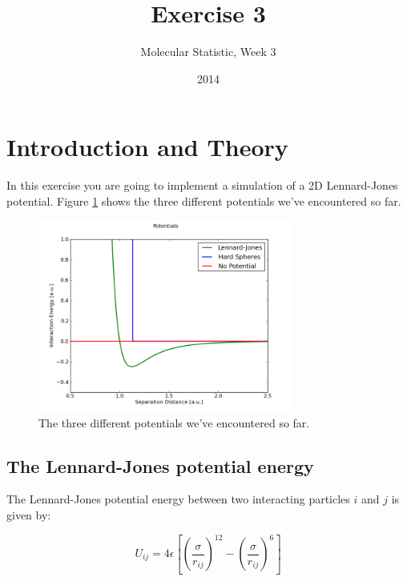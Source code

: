 \documentclass{article}
\title{Exercise 3}
\author{Molecular Statistic, Week 3}
\date{2014}
\begin{document}

\maketitle


\section{Introduction and Theory}

In this exercise you are going to implement a simulation of a 2D Lennard-Jones
potential. Figure \ref{fig:potentials} shows the three different potentials
we've encountered so far.

    \begin{figure}[h!]
    \begin{center}
        \includegraphics[width=0.75\textwidth]{potentials.png}
        \caption{The three different potentials we've encountered so far.}
        \label{fig:potentials}
    \end{center}
    \end{figure}


\subsection{The Lennard-Jones potential energy}

The Lennard-Jones potential energy between two interacting particles $i$ and
$j$ is given by:

\begin{equation}
    U_{ij} = 4 \epsilon \left[ (\frac{\sigma}{r_{ij}} )^{12} - (\frac{\sigma}{r_{ij}} )^6 \right]
\end{equation}
\end{document}
